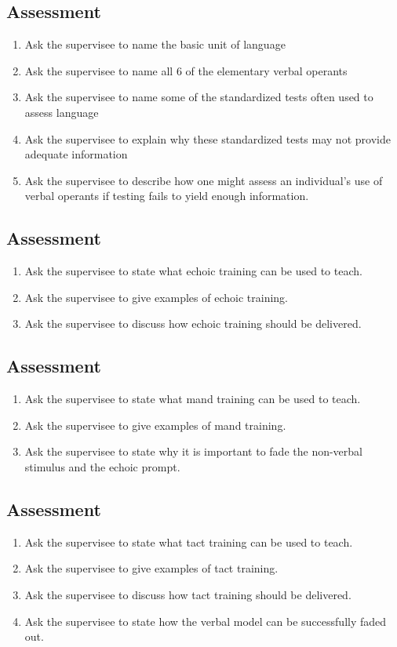 \subsection{Assessment}
\begin{enumerate}
\item Ask the supervisee to name the basic unit of language
\item Ask the supervisee to name all 6 of the elementary verbal operants
\item Ask the supervisee to name some of the standardized tests often used to assess language
\item Ask the supervisee to explain why these standardized tests may not provide adequate information
\item Ask the supervisee to describe how one might assess an individual's use of verbal operants if testing fails to yield enough information.
\end{enumerate}
%
\subsection{Assessment}
\begin{enumerate}
\item Ask the supervisee to state what echoic training can be used to teach.
\item Ask the supervisee to give examples of echoic training.
\item Ask the supervisee to discuss how echoic training should be delivered.
\end{enumerate}
%
\subsection{Assessment}
\begin{enumerate}
\item Ask the supervisee to state what mand training can be used to teach.
\item Ask the supervisee to give examples of mand training.
\item Ask the supervisee to state why it is important to fade the non-verbal stimulus and the echoic prompt.  
\end{enumerate}
%
\subsection{Assessment}
\begin{enumerate}
\item Ask the supervisee to state what tact training can be used to teach.
\item Ask the supervisee to give examples of tact training.
\item Ask the supervisee to discuss how tact training should be delivered.
\item Ask the supervisee to state how the verbal model can be successfully faded out.
\end{enumerate}
%

